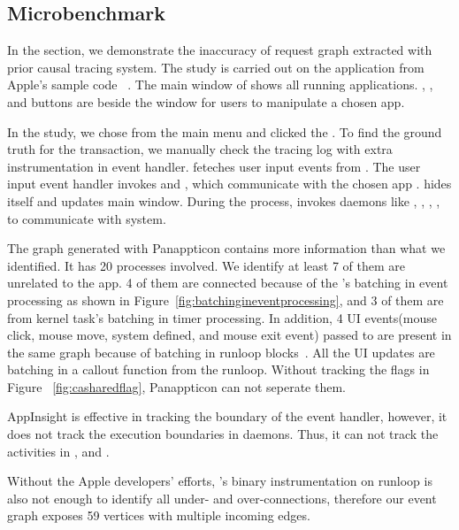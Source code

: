 \subsection{Microbenchmark} \label{sec:toystudy}

In the section, we demonstrate the inaccuracy of request graph extracted with
prior causal tracing system. The study is carried out on the application from
Apple's sample code ~\cite{applist}. The main window of 
shows all running applications. , , and 
buttons are beside the window for users to manipulate a chosen app.


In the study, we chose  from the main menu and clicked the
. To find the ground truth for the transaction, we manually
check the tracing log with extra instrumentation in event handler. 
feteches user input events from . The user input event handler
invokes  and , which communicate with the
chosen app .  hides itself and 
updates main window. During the process,  invokes daemons like
, , , , 
to communicate with system.

The graph generated with Panappticon contains more information than
what we identified. It has 20 processes involved. We identify at least
7 of them are unrelated to the app. 4 of them are connected because
of the 's batching in event processing as shown in
Figure~\ref{fig:batchingineventprocessing}, and 3 of them are from kernel task's
batching in timer processing. In addition, 4 UI events(mouse click, mouse move,
system defined, and mouse exit event) passed to  are present in the
same graph because of batching in runloop blocks~\cite{runloop}. All the UI
updates are batching in a callout function from the runloop. Without tracking
the flags in Figure ~\ref{fig:casharedflag}, Panappticon can not seperate them.

AppInsight is effective in tracking the boundary of the event handler, however,
it does not track the execution boundaries in daemons. Thus, it can not track
the activities in ,  and .

Without the Apple developers' efforts, \xxx's binary instrumentation on runloop
is also not enough to identify all under- and over-connections, therefore our
event graph exposes 59 vertices with multiple incoming edges.

